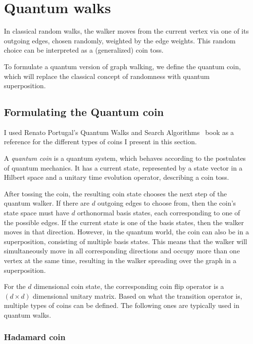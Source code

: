\chapter{Quantum walks}

In classical random walks, the walker moves from the current vertex via one of its outgoing edges, chosen randomly, weighted by the edge weights. This random choice can be interpreted as a (generalized) coin toss.

To formulate a quantum version of graph walking, we define the quantum coin, which will replace the classical concept of randomness with quantum superposition.

\section{Formulating the Quantum coin}

I used Renato Portugal's Quantum Walks and Search Algorithms~\cite{Portugal} book as a reference for the different types of coins I present in this section.

A \textit{quantum coin} is a quantum system, which behaves according to the postulates of quantum mechanics. It has a current state, represented by a state vector in a Hilbert space and a unitary time evolution operator, describing a coin toss.

After tossing the coin, the resulting coin state chooses the next step of the quantum walker. If there are $d$ outgoing edges to choose from, then the coin's state space must have $d$ orthonormal basis states, each corresponding to one of the possible edges. If the current state is one of the basis states, then the walker moves in that direction. However, in the quantum world, the coin can also be in a superposition, consisting of multiple basis states. This means that the walker will simultaneously move in all corresponding directions and occupy more than one vertex at the same time, resulting in the walker spreading over the graph in a superposition.

For the $d$ dimensional coin state, the corresponding coin flip operator is a $(d\times{}d)$ dimensional unitary matrix. Based on what the transition operator is, multiple types of coins can be defined. The following ones are typically used in quantum walks.

\subsection{Hadamard coin}

